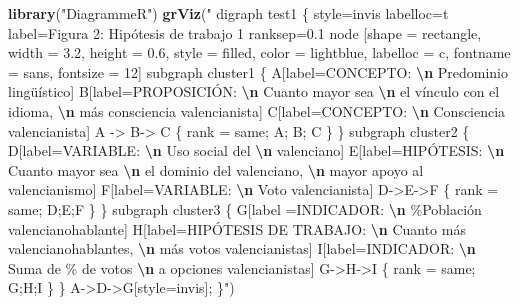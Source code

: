 \documentclass[
]{article}
\newenvironment{Shaded}{\begin{snugshade}}{\end{snugshade}}
\newcommand{\FunctionTok}[1]{\textcolor[rgb]{0.13,0.29,0.53}{\textbf{#1}}}
\newcommand{\NormalTok}[1]{#1}
\newcommand{\SpecialCharTok}[1]{\textcolor[rgb]{0.81,0.36,0.00}{\textbf{#1}}}
\newcommand{\StringTok}[1]{\textcolor[rgb]{0.31,0.60,0.02}{#1}}
\begin{document}
\begin{Shaded}
\begin{Highlighting}[]
\FunctionTok{library}\NormalTok{(}\StringTok{"DiagrammeR"}\NormalTok{)}
\FunctionTok{grViz}\NormalTok{(}\StringTok{"}
\StringTok{      digraph test1 \{}
\StringTok{      style=\textquotesingle{}invis\textquotesingle{}}
\StringTok{      labelloc=\textquotesingle{}t\textquotesingle{}}
\StringTok{      label=\textquotesingle{}Figura 2: Hipótesis de trabajo 1\textquotesingle{}}
\StringTok{      ranksep=0.1}
\StringTok{        node [shape = rectangle, width = 3.2, height = 0.6, style = filled, color = lightblue, labelloc = c, fontname = \textquotesingle{}sans\textquotesingle{}, fontsize = 12]}
\StringTok{        subgraph cluster1 \{}
\StringTok{        A[label=\textquotesingle{}CONCEPTO: }\SpecialCharTok{\textbackslash{}n}\StringTok{ Predominio lingüístico\textquotesingle{}]}
\StringTok{        B[label=\textquotesingle{}PROPOSICIÓN: }\SpecialCharTok{\textbackslash{}n}\StringTok{ Cuanto mayor sea }\SpecialCharTok{\textbackslash{}n}\StringTok{ el vínculo con el idioma, }\SpecialCharTok{\textbackslash{}n}\StringTok{ más consciencia valencianista\textquotesingle{}]}
\StringTok{        C[label=\textquotesingle{}CONCEPTO: }\SpecialCharTok{\textbackslash{}n}\StringTok{ Consciencia valencianista\textquotesingle{}]}
\StringTok{        A {-}\textgreater{} B{-}\textgreater{} C}
\StringTok{      \{ rank = same; A; B; C \}}
\StringTok{        \}}
\StringTok{        }
\StringTok{        subgraph cluster2 \{}
\StringTok{        }
\StringTok{        D[label=\textquotesingle{}VARIABLE: }\SpecialCharTok{\textbackslash{}n}\StringTok{ Uso social del }\SpecialCharTok{\textbackslash{}n}\StringTok{ valenciano\textquotesingle{}]}
\StringTok{        E[label=\textquotesingle{}HIPÓTESIS: }\SpecialCharTok{\textbackslash{}n}\StringTok{ Cuanto mayor sea }\SpecialCharTok{\textbackslash{}n}\StringTok{ el dominio del valenciano, }\SpecialCharTok{\textbackslash{}n}\StringTok{ mayor apoyo al valencianismo\textquotesingle{}]}
\StringTok{        F[label=\textquotesingle{}VARIABLE: }\SpecialCharTok{\textbackslash{}n}\StringTok{ Voto valencianista\textquotesingle{}]}
\StringTok{        D{-}\textgreater{}E{-}\textgreater{}F}
\StringTok{      \{ rank = same; D;E;F \}}
\StringTok{        \}}
\StringTok{        subgraph cluster3 \{}
\StringTok{        }
\StringTok{        G[label =\textquotesingle{}INDICADOR: }\SpecialCharTok{\textbackslash{}n}\StringTok{ \%Población valencianohablante\textquotesingle{}]}
\StringTok{        H[label=\textquotesingle{}HIPÓTESIS DE TRABAJO: }\SpecialCharTok{\textbackslash{}n}\StringTok{ Cuanto más valencianohablantes, }\SpecialCharTok{\textbackslash{}n}\StringTok{ más votos valencianistas\textquotesingle{}]}
\StringTok{        I[label=\textquotesingle{}INDICADOR: }\SpecialCharTok{\textbackslash{}n}\StringTok{ Suma de \% de votos }\SpecialCharTok{\textbackslash{}n}\StringTok{ a opciones valencianistas\textquotesingle{}]}
\StringTok{        G{-}\textgreater{}H{-}\textgreater{}I}
\StringTok{      \{ rank = same; G;H;I \}}
\StringTok{        \}}
\StringTok{        }
\StringTok{        A{-}\textgreater{}D{-}\textgreater{}G[style=invis];}
\StringTok{      \}"}\NormalTok{)}
\end{Highlighting}
\end{Shaded}
\end{document}

